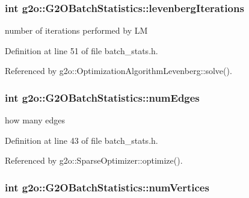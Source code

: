 \subsubsection[{\texorpdfstring{levenberg\+Iterations}{levenbergIterations}}]{\setlength{\rightskip}{0pt plus 5cm}int g2o\+::\+G2\+O\+Batch\+Statistics\+::levenberg\+Iterations}\hypertarget{structg2o_1_1G2OBatchStatistics_acd6b82e7401ec8c04e00b14bf76892a9}{}\label{structg2o_1_1G2OBatchStatistics_acd6b82e7401ec8c04e00b14bf76892a9}


number of iterations performed by LM 



Definition at line 51 of file batch\+\_\+stats.\+h.



Referenced by g2o\+::\+Optimization\+Algorithm\+Levenberg\+::solve().

\subsubsection[{\texorpdfstring{num\+Edges}{numEdges}}]{\setlength{\rightskip}{0pt plus 5cm}int g2o\+::\+G2\+O\+Batch\+Statistics\+::num\+Edges}\hypertarget{structg2o_1_1G2OBatchStatistics_ae8924cd0e0e7fee183cba73b706eb5a5}{}\label{structg2o_1_1G2OBatchStatistics_ae8924cd0e0e7fee183cba73b706eb5a5}


how many edges 



Definition at line 43 of file batch\+\_\+stats.\+h.



Referenced by g2o\+::\+Sparse\+Optimizer\+::optimize().

\subsubsection[{\texorpdfstring{num\+Vertices}{numVertices}}]{\setlength{\rightskip}{0pt plus 5cm}int g2o\+::\+G2\+O\+Batch\+Statistics\+::num\+Vertices}\hypertarget{structg2o_1_1G2OBatchStatistics_a2a3ecd684cb9e60c34afeee0d8f35d23}{}\label{structg2o_1_1G2OBatchStatistics_a2a3ecd684cb9e60c34afeee0d8f35d23}


